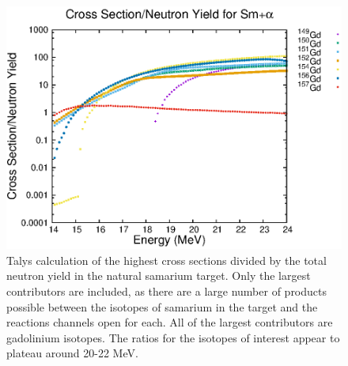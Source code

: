 \begin{figure}[t]
    \centering
    \includegraphics[scale=1]{Setup_Figs/Talys_Ratio.eps}
    \caption{Talys calculation of the highest cross sections divided by the total neutron yield in the natural samarium target. Only the largest contributors are included, as there are a large number of products possible between the isotopes of samarium in the target and the reactions channels open for each. All of the largest contributors are gadolinium isotopes. The ratios for the isotopes of interest appear to plateau around 20-22 MeV.}
    \label{fig:talys}
\end{figure}
